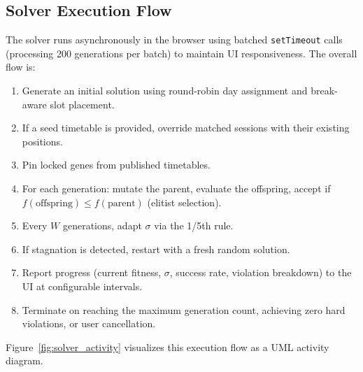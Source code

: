\subsection{Solver Execution Flow}

The solver runs asynchronously in the browser using batched \texttt{setTimeout} calls (processing 200 generations per batch) to maintain UI responsiveness. The overall flow is:
\begin{enumerate}
    \item Generate an initial solution using round-robin day assignment and break-aware slot placement.
    \item If a seed timetable is provided, override matched sessions with their existing positions.
    \item Pin locked genes from published timetables.
    \item For each generation: mutate the parent, evaluate the offspring, accept if $f(\text{offspring}) \leq f(\text{parent})$ (elitist selection).
    \item Every $W$ generations, adapt $\sigma$ via the 1/5th rule.
    \item If stagnation is detected, restart with a fresh random solution.
    \item Report progress (current fitness, $\sigma$, success rate, violation breakdown) to the UI at configurable intervals.
    \item Terminate on reaching the maximum generation count, achieving zero hard violations, or user cancellation.
\end{enumerate}

Figure~\ref{fig:solver_activity} visualizes this execution flow as a UML activity diagram.

